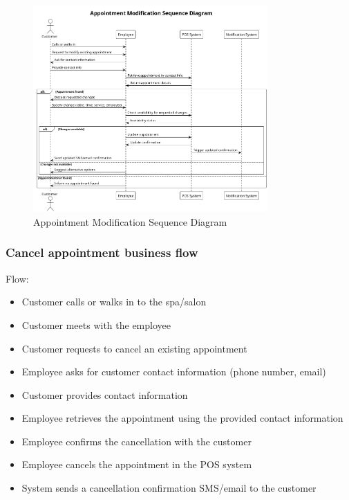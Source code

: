 \documentclass[]{VUMIFTemplateClass}
\begin{document}
\begin{figure}[H]
    \centering
    \includegraphics[width=0.8\textwidth]{images/diagrams/services/appointment_modification_sequence.png}
    \caption{Appointment Modification Sequence Diagram}
    \label{fig:appointment_modification_sequence}
\end{figure}

\subsubsection{Cancel appointment business flow}
Flow:
\begin{itemize}
    \setlength{\itemsep}{2pt}
    \setlength{\parskip}{0pt}
    \setlength{\parsep}{0pt}
    \item Customer calls or walks in to the spa/salon
    \item Customer meets with the employee
    \item Customer requests to cancel an existing appointment
    \item Employee asks for customer contact information (phone number, email)
    \item Customer provides contact information
    \item Employee retrieves the appointment using the provided contact information
    \item Employee confirms the cancellation with the customer
    \item Employee cancels the appointment in the POS system
    \item System sends a cancellation confirmation SMS/email to the customer
\end{itemize}
\end{document}
